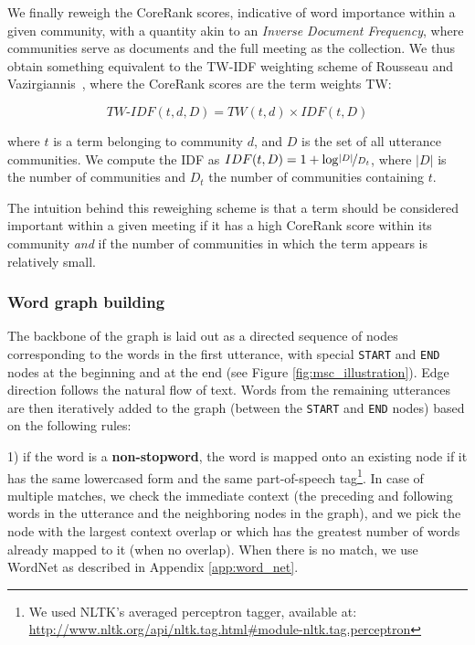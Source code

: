 \documentclass[11pt,a4paper]{article}
\begin{document}
We finally reweigh the CoreRank scores, indicative of word importance within a given community, with a quantity akin to an \textit{Inverse Document Frequency}, where communities serve as documents and the full meeting as the collection. We thus obtain something equivalent to the TW-IDF weighting scheme of Rousseau and Vazirgiannis~, where the CoreRank scores are the term weights TW:

\vspace{-0.75cm}

\begin{equation} \label{eq:tw-idf}
TW\text{-}IDF(t, d, D)=TW(t, d) \times IDF(t, D)
\end{equation}

where $t$ is a term belonging to community $d$, and $D$ is the set of all utterance communities. We compute the IDF as $IDF(t,D) = 1 + \mathrm{log}\nicefrac{|D|}{D_t}$, where $|D|$ is the number of communities and  $D_t$ the number of communities containing $t$.

The intuition behind this reweighing scheme is that a term should be considered important within a given meeting if it has a high CoreRank score within its community \textit{and} if the number of communities in which the term appears is relatively small.

\subsubsection*{Word graph building}
The backbone of the graph is laid out as a directed sequence of nodes corresponding to the words in the first utterance, with special \texttt{START} and \texttt{END} nodes at the beginning and at the end (see Figure \ref{fig:msc_illustration}). Edge direction follows the natural flow of text. Words from the remaining utterances are then iteratively added to the graph (between the \texttt{START} and \texttt{END} nodes) based on the following rules:\\

\vspace{-0.2cm}

1) if the word is a \textbf{non-stopword}, the word is mapped onto an existing node if it has the same lowercased form and the same part-of-speech tag\footnote{\tiny{We used NLTK's averaged perceptron tagger, available at: \url{http://www.nltk.org/api/nltk.tag.html\#module-nltk.tag.perceptron}}}. In case of multiple matches, we check the immediate context (the preceding and following words in the utterance and the neighboring nodes in the graph), and we pick the node with the largest context overlap or which has the greatest number of words already mapped to it (when no overlap). When there is no match, we use WordNet as described in Appendix \ref{app:word_net}.
\end{document}

